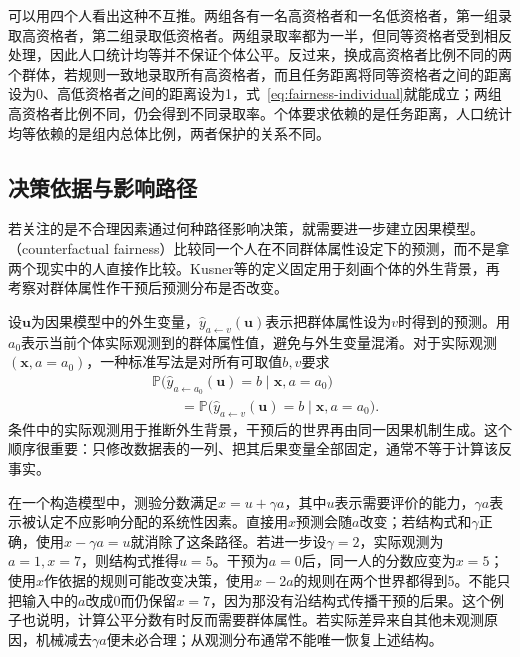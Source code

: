 可以用四个人看出这种不互推。两组各有一名高资格者和一名低资格者，第一组录取高资格者，第二组录取低资格者。两组录取率都为一半，但同等资格者受到相反处理，因此人口统计均等并不保证个体公平。反过来，换成高资格者比例不同的两个群体，若规则一致地录取所有高资格者，而且任务距离将同等资格者之间的距离设为0、高低资格者之间的距离设为1，式~\eqref{eq:fairness-individual}就能成立；两组高资格者比例不同，仍会得到不同录取率。个体要求依赖的是任务距离，人口统计均等依赖的是组内总体比例，两者保护的关系不同。

\subsection{决策依据与影响路径}
\label{sec:fairness-counterfactual-comparison}

若关注的是不合理因素通过何种路径影响决策，就需要进一步建立因果模型。（counterfactual fairness）比较同一个人在不同群体属性设定下的预测，而不是拿两个现实中的人直接作比较。Kusner等的定义固定用于刻画个体的外生背景，再考察对群体属性作干预后预测分布是否改变。

设$\bm{u}$为因果模型中的外生变量，$\hat y_{a\leftarrow v}(\bm{u})$表示把群体属性设为$v$时得到的预测。用$a_0$表示当前个体实际观测到的群体属性值，避免与外生变量混淆。对于实际观测$(\bm{x},a=a_0)$，一种标准写法是对所有可取值$b,v$要求
\begin{equation}
\begin{aligned}
 &\mathbb P\bigl(\hat y_{a\leftarrow a_0}(\bm{u})=b
       \mid\bm{x},a=a_0\bigr)\\
 &\qquad=\mathbb P\bigl(\hat y_{a\leftarrow v}(\bm{u})=b
       \mid\bm{x},a=a_0\bigr).
\end{aligned}
 \label{eq:fairness-counterfactual}
\end{equation}
条件中的实际观测用于推断外生背景，干预后的世界再由同一因果机制生成。这个顺序很重要：只修改数据表的一列、把其后果变量全部固定，通常不等于计算该反事实。

在一个构造模型中，测验分数满足$x=u+\gamma a$，其中$u$表示需要评价的能力，$\gamma a$表示被认定不应影响分配的系统性因素。直接用$x$预测会随$a$改变；若结构式和$\gamma$正确，使用$x-\gamma a=u$就消除了这条路径。若进一步设$\gamma=2$，实际观测为$a=1,x=7$，则结构式推得$u=5$。干预为$a=0$后，同一人的分数应变为$x=5$；使用$x$作依据的规则可能改变决策，使用$x-2a$的规则在两个世界都得到5。不能只把输入中的$a$改成0而仍保留$x=7$，因为那没有沿结构式传播干预的后果。这个例子也说明，计算公平分数有时反而需要群体属性。若实际差异来自其他未观测原因，机械减去$\gamma a$便未必合理；从观测分布通常不能唯一恢复上述结构。

